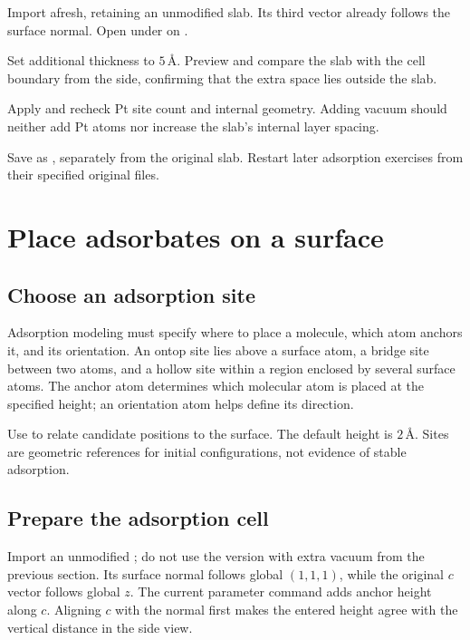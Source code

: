 

\begin{steps}
  \item Import  afresh, retaining an unmodified slab. Its third vector already follows the surface normal. Open  under  on .
  \item Set additional thickness to $5\,\text{\AA}$. Preview and compare the slab with the cell boundary from the side, confirming that the extra space lies outside the slab.
  \item Apply and recheck Pt site count and internal geometry. Adding vacuum should neither add Pt atoms nor increase the slab's internal layer spacing.
  \item Save as , separately from the original slab. Restart later adsorption exercises from their specified original files.
\end{steps}



\section{Place adsorbates on a surface}

\subsection{Choose an adsorption site}

Adsorption modeling must specify where to place a molecule, which atom anchors it, and its orientation. An ontop site lies above a surface atom, a bridge site between two atoms, and a hollow site within a region enclosed by several surface atoms. The anchor atom determines which molecular atom is placed at the specified height; an orientation atom helps define its direction.

Use  to relate candidate positions to the surface. The default height is $2\,\text{\AA}$. Sites are geometric references for initial configurations, not evidence of stable adsorption.

\subsection{Prepare the adsorption cell}

Import an unmodified ; do not use the version with extra vacuum from the previous section. Its surface normal follows global $(1,1,1)$, while the original $c$ vector follows global $z$. The current parameter command adds anchor height along $c$. Aligning $c$ with the normal first makes the entered height agree with the vertical distance in the side view.

